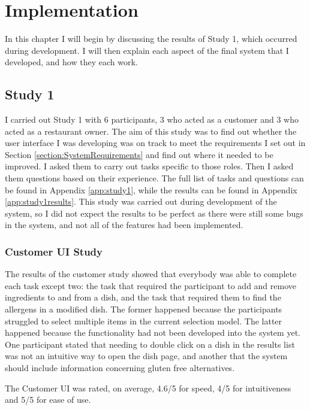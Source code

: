 \chapter{Implementation}

In this chapter I will begin by discussing the results of Study 1, which occurred during development. I will then explain each aspect of the final system that I developed, and how they each work.

\section{Study 1}
\label{section:Study1Results}

I carried out Study 1 with 6 participants, 3 who acted as a customer and 3 who acted as a restaurant owner. The aim of this study was to find out whether the user interface I was developing was on track to meet the requirements I set out in Section \ref{section:SystemRequirements} and find out where it needed to be improved. I asked them to carry out tasks specific to those roles. Then I asked them questions based on their experience. The full list of tasks and questions can be found in Appendix \ref{app:study1}, while the results can be found in Appendix \ref{app:study1results}. This study was carried out during development of the system, so I did not expect the results to be perfect as there were still some bugs in the system, and not all of the features had been implemented.

\subsection{Customer UI Study}

The results of the customer study showed that everybody was able to complete each task except two: the task that required the participant to add and remove ingredients to and from a dish, and the task that required them to find the allergens in a modified dish. The former happened because the participants struggled to select multiple items in the current selection model. The latter happened because the functionality had not been developed into the system yet. One participant stated that needing to double click on a dish in the results list was not an intuitive way to open the dish page, and another that the system should include information concerning gluten free alternatives.

The Customer UI was rated, on average, 4.6/5 for speed, 4/5 for intuitiveness and 5/5 for ease of use.

